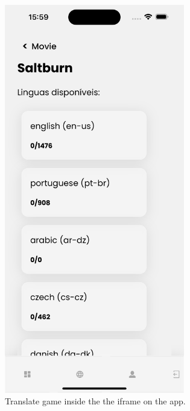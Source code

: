 \documentclass[12pt]{article}
\begin{document}
\begin{frame}{}
\begin{figure}[!h]
\begin{minipage}[b]{0.31\linewidth}
          \includegraphics[width=0.7\textwidth]{assets/18.png}
        \end{minipage}        
        \hspace{0.1cm}
        \begin{minipage}[b]{0.31\linewidth}
          \centering
          \caption{
           Translate game inside the the iframe on the app.
          }
          \label{fig:app6}

\end{minipage}
\end{figure}
\end{frame}
\end{document}
